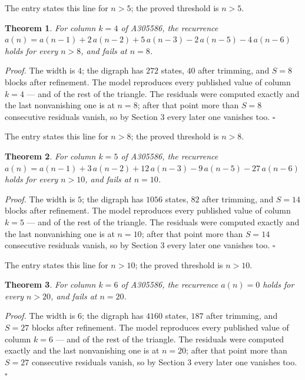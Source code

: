 \documentclass[11pt]{article}
\newtheorem{theorem}{Theorem}
\theoremstyle{definition}
\begin{document}
The entry states this line for $n > 5$; the proved threshold is $n > 5$.

\begin{theorem} For column $k = 4$ of A305586, the recurrence $a(n) = a(n-1) + 2\,a(n-2) + 5\,a(n-3) - 2\,a(n-5) - 4\,a(n-6)$ holds for every $n > 8$, and fails at $n = 8$.\end{theorem}

{\itshape Proof.} The width is $4$; the digraph has $272$ states, $40$ after trimming, and $S = 8$ blocks after refinement. The model reproduces every published value of column $k = 4$ --- and of the rest of the triangle. The residuals were computed exactly and the last nonvanishing one is at $n = 8$; after that point more than $S = 8$ consecutive residuals vanish, so by Section 3 every later one vanishes too. $\square$

The entry states this line for $n > 8$; the proved threshold is $n > 8$.

\begin{theorem} For column $k = 5$ of A305586, the recurrence $a(n) = a(n-1) + 3\,a(n-2) + 12\,a(n-3) - 9\,a(n-5) - 27\,a(n-6)$ holds for every $n > 10$, and fails at $n = 10$.\end{theorem}

{\itshape Proof.} The width is $5$; the digraph has $1056$ states, $82$ after trimming, and $S = 14$ blocks after refinement. The model reproduces every published value of column $k = 5$ --- and of the rest of the triangle. The residuals were computed exactly and the last nonvanishing one is at $n = 10$; after that point more than $S = 14$ consecutive residuals vanish, so by Section 3 every later one vanishes too. $\square$

The entry states this line for $n > 10$; the proved threshold is $n > 10$.

\begin{theorem} For column $k = 6$ of A305586, the recurrence $a(n) = 0$ holds for every $n > 20$, and fails at $n = 20$.\end{theorem}

{\itshape Proof.} The width is $6$; the digraph has $4160$ states, $187$ after trimming, and $S = 27$ blocks after refinement. The model reproduces every published value of column $k = 6$ --- and of the rest of the triangle. The residuals were computed exactly and the last nonvanishing one is at $n = 20$; after that point more than $S = 27$ consecutive residuals vanish, so by Section 3 every later one vanishes too. $\square$
\end{document}
